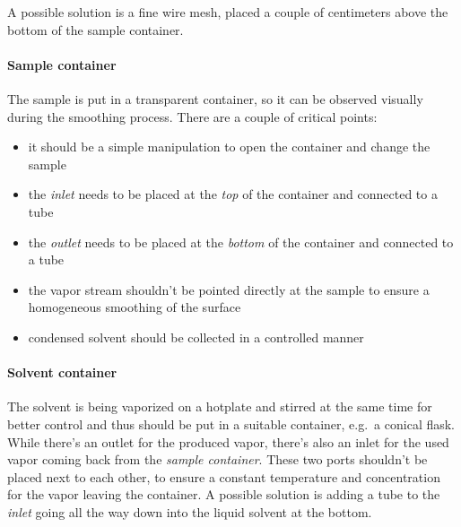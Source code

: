 \documentclass[a4paper, 12pt]{paper}
\begin{document}
A possible solution is a fine wire mesh, placed a couple of centimeters above
the bottom of the sample container.

\paragraph{Sample container}
The sample is put in a transparent container, so it can be observed visually
during the smoothing process. There are a couple of critical points:
\begin{itemize}
    \item it should be a simple manipulation to open the container and change
        the sample
    \item the \emph{inlet} needs to be placed at the \emph{top} of the container
        and connected to a tube
    \item the \emph{outlet} needs to be placed at the \emph{bottom} of the
        container and connected to a tube
    \item the vapor stream shouldn't be pointed directly at the sample to ensure
        a homogeneous smoothing of the surface
    \item condensed solvent should be collected in a controlled manner
\end{itemize}

\paragraph{Solvent container}
The solvent is being vaporized on a hotplate and stirred at the same time for
better control and thus should be put in a suitable container, e.g.\ a conical
flask. While there's an outlet for the produced vapor, there's also an inlet
for the used vapor coming back from the \emph{sample container}. These two
ports shouldn't be placed next to each other, to ensure a constant temperature
and concentration for the vapor leaving the container. A possible solution is
adding a tube to the \emph{inlet} going all the way down into the liquid solvent
at the bottom.
\end{document}
